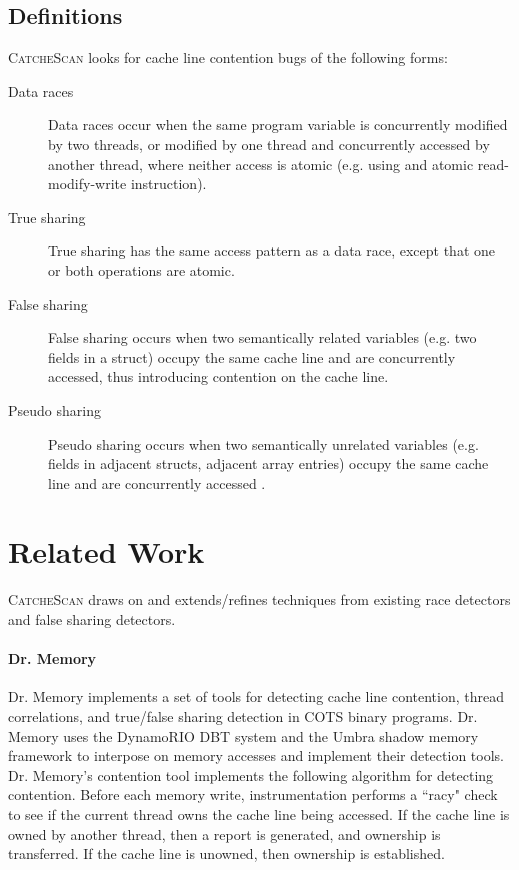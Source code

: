 \documentclass{sig-alternate}
\newcommand{\TextToolname}{CatcheScan}
\newcommand{\Toolname}{\textsc{\TextToolname{}}}
\begin{document}
\subsection{Definitions}
\Toolname{} looks for cache line contention bugs of the following forms:
\begin{description}
\item[Data races] Data races occur when the same program variable is concurrently modified by two threads, or 
modified by one thread and concurrently accessed by another thread, where neither access is atomic (e.g. using
and atomic read-modify-write instruction).

\item[True sharing] True sharing has the same access pattern as a data race, except that one or both operations
are atomic.

\item[False sharing] False sharing occurs when two semantically related variables (e.g. two fields in a struct) occupy
the same cache line and are concurrently accessed, thus introducing contention on the cache line.

\item[Pseudo sharing] Pseudo sharing occurs when two semantically unrelated variables (e.g. fields in adjacent structs,
adjacent array entries) occupy the same cache line and are concurrently accessed \cite{DegenerateSharingAndFalseCoherence}.
\end{description}



\section{Related Work}\label{sec:background}
\Toolname{} draws on and extends/refines techniques from existing race detectors and false sharing detectors.

\paragraph{Dr. Memory}
Dr. Memory \cite{DrContention} implements a set of tools for detecting cache line contention, thread correlations,
and true/false sharing detection in COTS binary programs. Dr. Memory uses the DynamoRIO \cite{DynamoRIO} DBT system
and the Umbra shadow memory framework \cite{Umbra} to interpose on memory accesses and implement their
detection tools. Dr. Memory's contention tool implements the following algorithm for detecting contention. Before each
memory write,  instrumentation performs a ``racy" check to see if the current thread owns the cache line being accessed.
If the cache line is owned by another thread, then a report is generated, and ownership is transferred. If the cache line is
unowned, then ownership is established.
\end{document}
